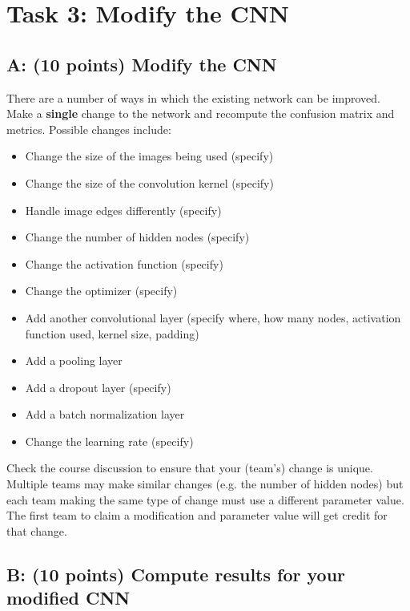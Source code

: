 \documentclass[11pt]{article}
\renewcommand\:{\colon} %
\begin{document}
\section{Task 3: Modify the CNN}
\subsection{A: (10 points) Modify the CNN}

There are a number of ways in which the existing network can be improved.  Make a \textbf{single} change to the network and recompute the confusion matrix and metrics.   Possible changes include:

\begin{itemize}
\item Change the size of the images being used (specify)
\item Change the size of the convolution kernel (specify)
\item Handle image edges differently (specify)
\item Change the number of hidden nodes (specify)
\item Change the activation function (specify) 
\item Change the optimizer (specify)
\item Add another convolutional layer (specify where, how many nodes, activation function used, kernel size, padding)
\item Add a pooling layer
\item Add a dropout layer (specify)
\item Add a batch normalization layer
\item Change the learning rate (specify)
\end{itemize}

Check the course discussion to ensure that your (team's) change is unique. Multiple teams may make similar changes (e.g. the number of hidden nodes) but each team making the same type of change must use a different parameter value.  The first team to claim a modification and parameter value will get credit for that change.

\subsection{B: (10 points) Compute results for your modified CNN}
\end{document}
